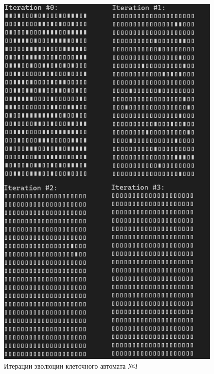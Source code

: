 \documentclass[a4paper, final]{article}
\begin{document}
\begin{figure}[H]
  \centering
  \includegraphics[scale=0.4]{example3_res.png}
  \caption{Итерации эволюции клеточного автомата №3}
  \label{img:example3_res}
\end{figure}
\end{document}
